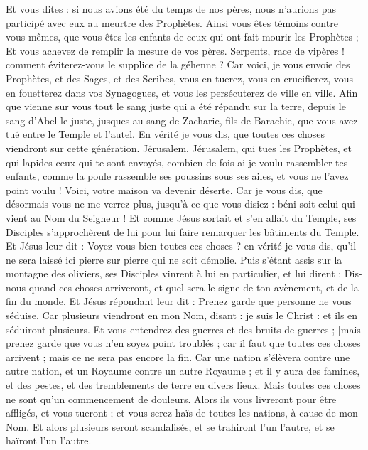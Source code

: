 \begin{multicols}{2}
Et vous dites : si nous avions été du temps de nos pères, nous n'aurions pas participé avec eux au meurtre des Prophètes.
Ainsi vous êtes témoins contre vous-mêmes, que vous êtes les enfants de ceux qui ont fait mourir les Prophètes ;
Et vous achevez de remplir la mesure de vos pères.
Serpents, race de vipères ! comment éviterez-vous le supplice de la géhenne ?
Car voici, je vous envoie des Prophètes, et des Sages, et des Scribes, vous en tuerez, vous en crucifierez, vous en fouetterez dans vos Synagogues, et vous les persécuterez de ville en ville.
Afin que vienne sur vous tout le sang juste qui a été répandu sur la terre, depuis le sang d'Abel le juste, jusques au sang de Zacharie, fils de Barachie, que vous avez tué entre le Temple et l'autel.
En vérité je vous dis, que toutes ces choses viendront sur cette génération.
Jérusalem, Jérusalem, qui tues les Prophètes, et qui lapides ceux qui te sont envoyés, combien de fois ai-je voulu rassembler tes enfants, comme la poule rassemble ses poussins sous ses ailes, et vous ne l'avez point voulu !
Voici, votre maison va devenir déserte.
Car je vous dis, que désormais vous ne me verrez plus, jusqu'à ce que vous disiez : béni soit celui qui vient au Nom du Seigneur !
\VerseOne{}Et comme Jésus sortait et s'en allait du Temple, ses Disciples s'approchèrent de lui pour lui faire remarquer les bâtiments du Temple.
Et Jésus leur dit : Voyez-vous bien toutes ces choses ? en vérité je vous dis, qu'il ne sera laissé ici pierre sur pierre qui ne soit démolie.
Puis s'étant assis sur la montagne des oliviers, ses Disciples vinrent à lui en particulier, et lui dirent : Dis-nous quand ces choses arriveront, et quel sera le signe de ton avènement, et de la fin du monde.
Et Jésus répondant leur dit : Prenez garde que personne ne vous séduise.
Car plusieurs viendront en mon Nom, disant : je suis le Christ : et ils en séduiront plusieurs.
Et vous entendrez des guerres et des bruits de guerres ; [mais] prenez garde que vous n'en soyez point troublés ; car il faut que toutes ces choses arrivent ; mais ce ne sera pas encore la fin.
Car une nation s'élèvera contre une autre nation, et un Royaume contre un autre Royaume ; et il y aura des famines, et des pestes, et des tremblements de terre en divers lieux.
Mais toutes ces choses ne sont qu'un commencement de douleurs.
Alors ils vous livreront pour être affligés, et vous tueront ; et vous serez haïs de toutes les nations, à cause de mon Nom.
Et alors plusieurs seront scandalisés, et se trahiront l'un l'autre, et se haïront l'un l'autre.

\end{multicols}
